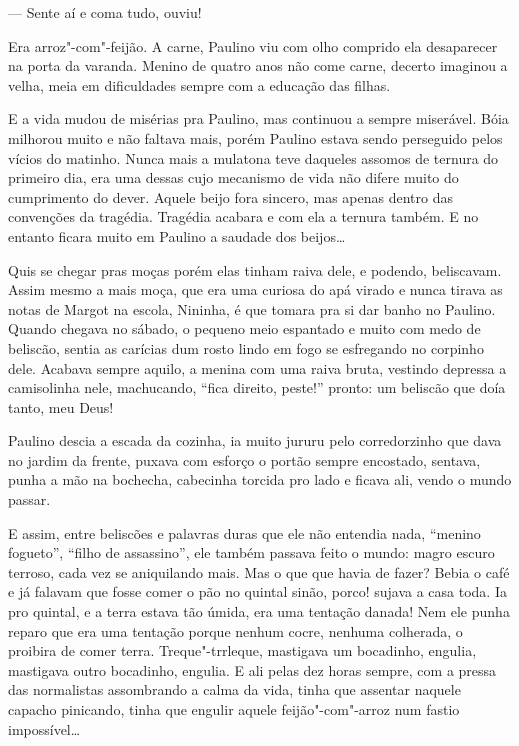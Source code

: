 \begin{linenumbers}
--- Sente aí e coma tudo, ouviu!

Era arroz"-com"-feijão. A carne, Paulino viu com olho comprido ela
desaparecer na porta da varanda. Menino de quatro anos não come carne,
decerto imaginou a velha, meia em dificuldades sempre com a educação das
filhas.

E a vida mudou de misérias pra Paulino, mas continuou a sempre
miserável. Bóia milhorou muito e não faltava mais, porém Paulino estava
sendo perseguido pelos vícios do matinho. Nunca mais a mulatona teve
daqueles assomos de ternura do primeiro dia, era uma dessas cujo
mecanismo de vida não difere muito do cumprimento do dever. Aquele beijo
fora sincero, mas apenas dentro das convenções da tragédia. Tragédia
acabara e com ela a ternura também. E no entanto ficara muito em Paulino
a saudade dos beijos\ldots{}

Quis se chegar pras moças porém elas tinham raiva dele, e podendo,
beliscavam. Assim mesmo a mais moça, que era uma curiosa do apá virado e
nunca tirava as notas de Margot na escola, Nininha, é que tomara pra si
dar banho no Paulino. Quando chegava no sábado, o pequeno meio espantado
e muito com medo de beliscão, sentia as carícias dum rosto lindo em fogo
se esfregando no corpinho dele. Acabava sempre aquilo, a menina com uma
raiva bruta, vestindo depressa a camisolinha nele, machucando, ``fica
direito, peste!'' pronto: um beliscão que doía tanto, meu Deus!

Paulino descia a escada da cozinha, ia muito jururu pelo corredorzinho
que dava no jardim da frente, puxava com esforço o portão sempre
encostado, sentava, punha a mão na bochecha, cabecinha torcida pro lado
e ficava ali, vendo o mundo passar.

E assim, entre beliscões e palavras duras que ele não entendia nada,
``menino fogueto'', ``filho de assassino'', ele também passava feito o
mundo: magro escuro terroso, cada vez se aniquilando mais. Mas o que que
havia de fazer? Bebia o café e já falavam que fosse comer o pão no
quintal sinão, porco! sujava a casa toda. Ia pro quintal, e a terra
estava tão úmida, era uma tentação danada! Nem ele punha reparo que era
uma tentação porque nenhum cocre, nenhuma colherada, o proibira de comer
terra. Treque"-trrleque, mastigava um bocadinho, engulia, mastigava outro
bocadinho, engulia. E ali pelas dez horas sempre, com a pressa das
normalistas assombrando a calma da vida, tinha que assentar naquele
capacho pinicando, tinha que engulir aquele feijão"-com"-arroz num fastio
impossível\ldots{}


\end{linenumbers}
